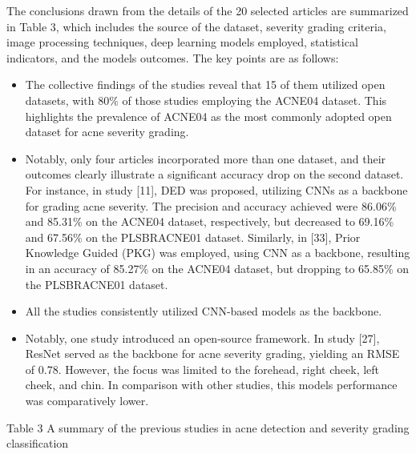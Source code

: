 \documentclass[16pt]{extarticle}
\begin{document}
The conclusions drawn from the details of the 20 selected articles are
summarized in Table 3, which includes the source of the dataset,
severity grading criteria, image processing techniques, deep learning
models employed, statistical indicators, and the model\textquotesingle s
outcomes. The key points are as follows:

\begin{itemize}
\item
  The collective findings of the studies reveal that 15 of them utilized
  open datasets, with 80\% of those studies employing the ACNE04
  dataset. This highlights the prevalence of ACNE04 as the most commonly
  adopted open dataset for acne severity grading.
\item
  Notably, only four articles incorporated more than one dataset, and
  their outcomes clearly illustrate a significant accuracy drop on the
  second dataset. For instance, in study {[}11{]}, DED was proposed,
  utilizing CNNs as a backbone for grading acne severity. The precision
  and accuracy achieved were 86.06\% and 85.31\% on the ACNE04 dataset,
  respectively, but decreased to 69.16\% and 67.56\% on the PLSBRACNE01
  dataset. Similarly, in {[}33{]}, Prior Knowledge Guided (PKG) was
  employed, using CNN as a backbone, resulting in an accuracy of 85.27\%
  on the ACNE04 dataset, but dropping to 65.85\% on the PLSBRACNE01
  dataset.
\item
  All the studies consistently utilized CNN-based models as the
  backbone.
\item
  Notably, one study introduced an open-source framework. In study
  {[}27{]}, ResNet served as the backbone for acne severity grading,
  yielding an RMSE of 0.78. However, the focus was limited to the
  forehead, right cheek, left cheek, and chin. In comparison with other
  studies, this model\textquotesingle s performance was comparatively
  lower.
\end{itemize}

Table 3 A summary of the previous studies in acne detection and severity
grading classification
\end{document}
